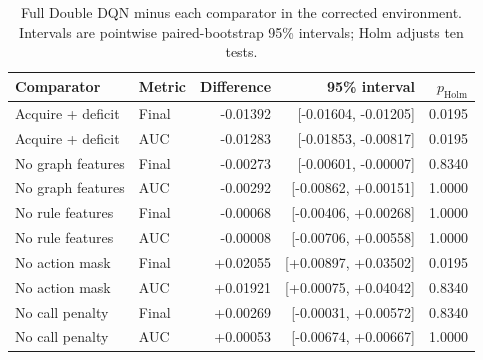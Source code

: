 \begin{table}[t]
\centering
\caption{Full Double DQN minus each comparator in the corrected environment. Intervals are pointwise paired-bootstrap 95\% intervals; Holm adjusts ten tests.}
\label{tab:offline_tests}
\footnotesize
\setlength{\tabcolsep}{3pt}
\begin{tabular*}{\textwidth}{@{\extracolsep{\fill}}llrrr@{}}
\toprule
Comparator & Metric & Difference & 95\% interval & $p_{\mathrm{Holm}}$ \\
\midrule
Acquire + deficit & Final & -0.01392 & [-0.01604, -0.01205] & 0.0195 \\
Acquire + deficit & AUC & -0.01283 & [-0.01853, -0.00817] & 0.0195 \\
No graph features & Final & -0.00273 & [-0.00601, -0.00007] & 0.8340 \\
No graph features & AUC & -0.00292 & [-0.00862, +0.00151] & 1.0000 \\
No rule features & Final & -0.00068 & [-0.00406, +0.00268] & 1.0000 \\
No rule features & AUC & -0.00008 & [-0.00706, +0.00558] & 1.0000 \\
No action mask & Final & +0.02055 & [+0.00897, +0.03502] & 0.0195 \\
No action mask & AUC & +0.01921 & [+0.00075, +0.04042] & 0.8340 \\
No call penalty & Final & +0.00269 & [-0.00031, +0.00572] & 0.8340 \\
No call penalty & AUC & +0.00053 & [-0.00674, +0.00667] & 1.0000 \\
\bottomrule
\end{tabular*}
\end{table}
